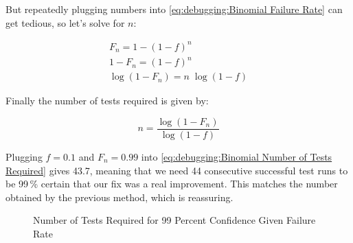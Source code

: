 But repeatedly plugging numbers into
\cref{eq:debugging:Binomial Failure Rate}
can get tedious, so let's solve for $n$:

\begin{eqnarray}
	F_n = 1-\left(1-f\right)^n \\
	1 - F_n = \left(1-f\right)^n \\
	\log \left(1 - F_n\right) = n \; \log \left(1 - f\right)
\end{eqnarray}

Finally the number of tests required is given by:

\begin{equation}
	n = \frac{\log\left(1 - F_n\right)}{\log\left(1 - f\right)}
\label{eq:debugging:Binomial Number of Tests Required}
\end{equation}

Plugging $f=0.1$ and $F_n=0.99$ into
\cref{eq:debugging:Binomial Number of Tests Required}
gives 43.7, meaning that we need 44 consecutive successful test
runs to be 99\,\% certain that our fix was a real improvement.
This matches the number obtained by the previous method, which
is reassuring.

\QuickQuizEnd

\begin{figure}
\centering
{}
\caption{Number of Tests Required for 99 Percent Confidence Given Failure Rate}
\label{fig:debugging:Number of Tests Required for 99 Percent Confidence Given Failure Rate}
\end{figure}

